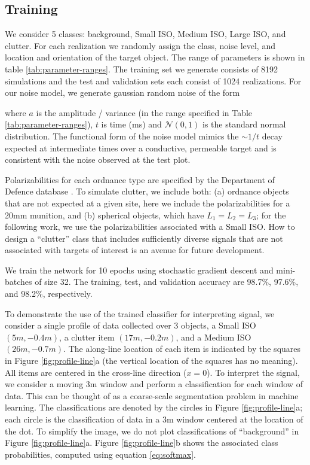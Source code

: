 \documentclass{segabs}
\begin{document}
\vspace{-0.25cm}
\subsection{Training}
\vspace{-0.4cm}

We consider 5 classes: background, Small ISO, Medium ISO, Large ISO, and clutter. For each realization we randomly assign the class, noise level, and location and orientation of the target object. The range of parameters is shown in table \ref{tab:parameter-ranges}. The training set we generate consists of 8192 simulations and the test and validation sets each consist of 1024 realizations. For our noise model, we generate gaussian random noise of the form

where $a$ is the amplitude / variance (in the range specified in Table \ref{tab:parameter-ranges}), $t$ is time (ms) and $\mathcal{N}(0, 1)$ is the standard normal distribution. The functional form of the noise model mimics the $\sim 1/t$ decay expected at intermediate times over a conductive, permeable target \citep{Pasion1999} and is consistent with the noise observed at the test plot.

Polarizabilities for each ordnance type are specified by the Department of Defence database \citep{Murray2016}. To simulate clutter, we include both: (a) ordnance objects that are not expected at a given site, here we include the polarizabilities for a 20mm munition, and (b) spherical objects, which have $L_1 = L_2 = L_3$; for the following work, we use the polarizabilities associated with a Small ISO. How to design a ``clutter'' class that includes sufficiently diverse signals that are not associated with targets of interest is an avenue for future development.

We train the network for 10 epochs using stochastic gradient descent and mini-batches of size 32. The training, test, and validation accuracy are 98.7\%, 97.6\%, and 98.2\%, respectively.

To demonstrate the use of the trained classifier for interpreting signal, we consider a single profile of data collected over 3 objects, a Small ISO $(5m, -0.4m)$, a clutter item $(17m, -0.2m)$, and a Medium ISO $(26m, -0.7m)$. The along-line location of each item is indicated by the squares in Figure \ref{fig:profile-line}a (the vertical location of the squares has no meaning). All items are centered in the cross-line direction ($x=0$). To interpret the signal, we consider a moving 3m window and perform a classification for each window of data. This can be thought of as a coarse-scale segmentation problem in machine learning. The classifications are denoted by the circles in Figure \ref{fig:profile-line}a; each circle is the classification of data in a 3m window centered at the location of the dot. To simplify the image, we do not plot classifications of ``background'' in Figure \ref{fig:profile-line}a. Figure \ref{fig:profile-line}b shows the associated class probabilities, computed using equation \ref{eq:softmax}.
\end{document}
